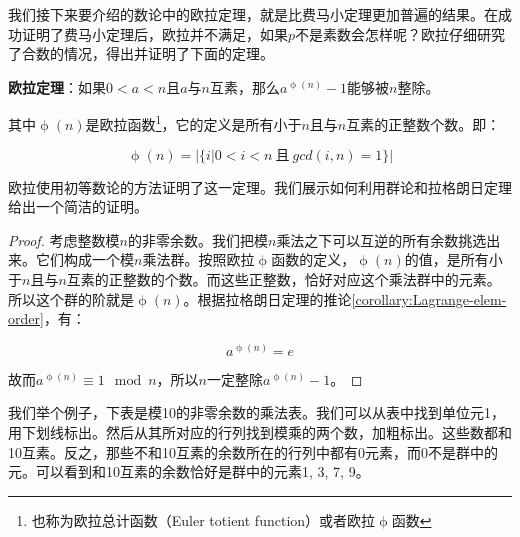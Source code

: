\documentclass[b5paper]{ctexart}
\begin{document}
我们接下来要介绍的数论中的欧拉定理，就是比费马小定理更加普遍的结果。在成功证明了费马小定理后，欧拉并不满足，如果$p$不是素数会怎样呢？欧拉仔细研究了合数的情况，得出并证明了下面的定理。

 
\begin{theorem}
\textbf{欧拉定理}：如果$0 < a < n$且$a$与$n$互素，那么$a^{\upphi(n)} - 1$能够被$n$整除。
\end{theorem}

其中$\upphi(n)$是欧拉函数\footnote{也称为欧拉总计函数（Euler totient function）或者欧拉$\upphi$函数}，它的定义是所有小于$n$且与$n$互素的正整数个数。即：

\[
\upphi(n) = |\{i | 0 < i < n\ \text{且}\ gcd(i, n) = 1 \}|
\]

欧拉使用初等数论的方法证明了这一定理。我们展示如何利用群论和拉格朗日定理给出一个简洁的证明。

\begin{proof}
考虑整数模$n$的非零余数。我们把模$n$乘法之下可以互逆的所有余数挑选出来。它们构成一个模$n$乘法群。按照欧拉$\upphi$函数的定义，$\upphi(n)$的值，是所有小于$n$且与$n$互素的正整数的个数。而这些正整数，恰好对应这个乘法群中的元素。所以这个群的阶就是$\upphi(n)$。根据拉格朗日定理的推论\ref{corollary:Lagrange-elem-order}，有：

\[
a^{\upphi(n)} = e
\]

故而$a^{\upphi(n)} \equiv 1 \mod n$，所以$n$一定整除$a^{\upphi(n)} - 1$。
\end{proof}

我们举个例子，下表是模10的非零余数的乘法表。我们可以从表中找到单位元1，用下划线标出。然后从其所对应的行列找到模乘的两个数，加粗标出。这些数都和10互素。反之，那些不和10互素的余数所在的行列中都有0元素，而0不是群中的元。可以看到和10互素的余数恰好是群中的元素1, 3, 7, 9。
\end{document}
